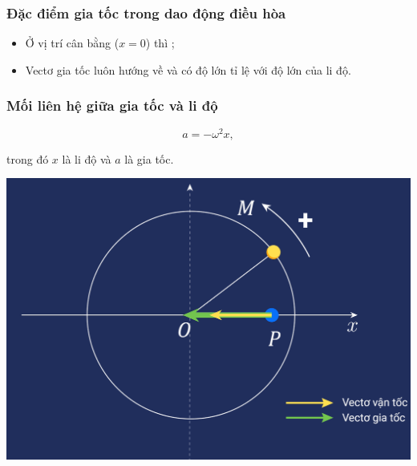 \subsubsection{Đặc điểm gia tốc trong dao động điều hòa}
\begin{itemize}
	\item Ở vị trí cân bằng ($x=0$) thì ;
	\item Vectơ gia tốc luôn hướng về  và có độ lớn tỉ lệ với độ lớn của li độ.
\end{itemize}

\subsubsection{Mối liên hệ giữa gia tốc và li độ}
\begin{equation*} 
	a=-\omega^2 x,
\end{equation*}

trong đó $x$ là li độ và $a$ là gia tốc.
\begin{center}
	\includegraphics[scale=0.4]{../figs/VN12-PH-02-A-001-2-V2-1.png}
\end{center}

